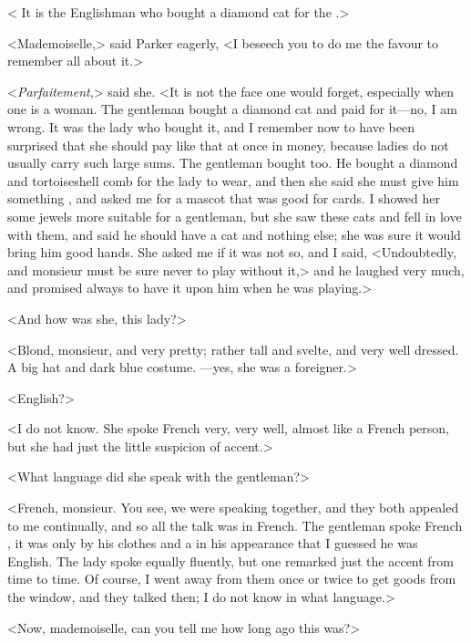 < It is the Englishman who bought a diamond cat for the .>

<Mademoiselle,> said Parker eagerly, <I beseech you to do me the favour to remember all about it.>

<\foreignlanguage{french}{\textit{Parfaitement},}> said she. <It is not the face one would forget, especially when one is a woman. The gentleman bought a diamond cat and paid for it—no, I am wrong. It was the lady who bought it, and I remember now to have been surprised that she should pay like that at once in money, because ladies do not usually carry such large sums. The gentleman bought too. He bought a diamond and tortoiseshell comb for the lady to wear, and then she said she must give him something , and asked me for a mascot that was good for cards. I showed her some jewels more suitable for a gentleman, but she saw these cats and fell in love with them, and said he should have a cat and nothing else; she was sure it would bring him good hands. She asked me if it was not so, and I said, <Undoubtedly, and monsieur must be sure never to play without it,> and he laughed very much, and promised always to have it upon him when he was playing.>

<And how was she, this lady?>

<Blond, monsieur, and very pretty; rather tall and svelte, and very well dressed. A big hat and dark blue costume. —yes, she was a foreigner.>

<English?>

<I do not know. She spoke French very, very well, almost like a French person, but she had just the little suspicion of accent.>

<What language did she speak with the gentleman?>

<French, monsieur. You see, we were speaking together, and they both appealed to me continually, and so all the talk was in French. The gentleman spoke French , it was only by his clothes and a  in his appearance that I guessed he was English. The lady spoke equally fluently, but one remarked just the accent from time to time. Of course, I went away from them once or twice to get goods from the window, and they talked then; I do not know in what language.>

<Now, mademoiselle, can you tell me how long ago this was?>

